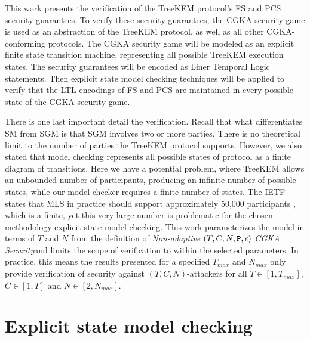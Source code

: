This work presents the verification of the TreeKEM protocol's FS and PCS security guarantees.
To verify these security guarantees, the CGKA security game is used as an abstraction of the TreeKEM protocol, as well as all other CGKA-conforming protocols.
The CGKA security game will be modeled as an explicit finite state transition machine, representing all possible TreeKEM execution states.
The security guarantees will be encoded as Liner Temporal Logic statements.
Then explicit state model checking techniques will be applied to verify that the LTL encodings of FS and PCS are maintained in every possible state of the CGKA security game.

There is one last important detail the verification.
Recall that what differentiates SM from SGM is that SGM involves two or more parties.
There is no theoretical limit to the number of parties the TreeKEM protocol supports.
However, we also stated that model checking represents all possible states of protocol as a finite diagram of transitions.
Here we have a potential problem, where TreeKEM allows an unbounded number of participants, producing an infinite number of possible states, while our model checker requires a finite number of states.
The IETF states that MLS in practice should support approximately 50,000 participants \autocite{Omara2020}, which is a finite, yet this very large number is problematic for the chosen methodology explicit state model checking.
This work parameterizes the model in terms of \(T\) and \(N\) from the definition of \emph{Non-adaptive} \((T, C, N, \textbf{\texttt{P}}, \epsilon)\) \emph{CGKA Security}and limits the scope of verification to within the selected parameters.
In practice, this means the results presented for a specified \(T_{max}\) and \(N_{max}\) only provide verification of security against \((T, C, N)\)-attackers for all \(T \in [1, T_{max}]\), \(C \in [1, T]\) and \(N \in [2, N_{max}]\).


\hypertarget{explicit-state-model-checking}{%
\section{Explicit state model checking}\label{explicit-state-model-checking}}


